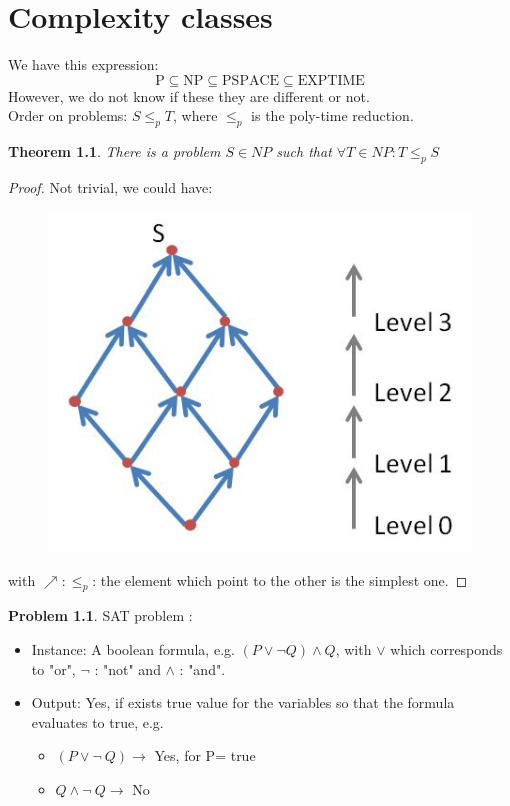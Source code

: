 \documentclass[11pt]{report}
\newtheorem{theorem}{Theorem}[section]
\theoremstyle{definition}
\newtheorem{definition}{Problem}
\theoremstyle{remark}
\begin{document}
\chapter{Complexity classes}
We have this expression:
$$ \text{P} \subseteq \text{NP} \subseteq \text{PSPACE} \subseteq \text{EXPTIME}$$
However, we do not know if these they are different or not.\\
Order on problems: $S \leq_p T$, where $\leq_p$ is the poly-time reduction.
\begin{theorem} 
There is a problem $S \in NP$ such that $\forall T \in NP: T \leq_p S$ 
\end{theorem} 

\begin{proof}
Not trivial, we could have: \\

\begin{figure}[h!]
\centering
\includegraphics[scale=0.5]{fig_1.jpg}
\end{figure}

with $\nearrow : \leq_p$: the element which point to the other is the simplest one.
\end{proof}

\begin{definition} SAT problem :\\ 
\begin{itemize}
\item Instance: A boolean formula, e.g. $ \left( P \vee \neg Q \right) \wedge Q$, with $\vee$ which corresponds to "or", $\neg$ : "not" and $\wedge$ : "and".
\item Output: Yes, if exists true value for the variables so that the formula evaluates to true, e.g.  \begin{itemize}
\item $\left( P \vee \neg \ Q \right) \rightarrow$ Yes, for P= true
\item $Q \wedge \neg \ Q \rightarrow$ No
\end{itemize}  
\end{itemize}
\end{definition}
\end{document}
